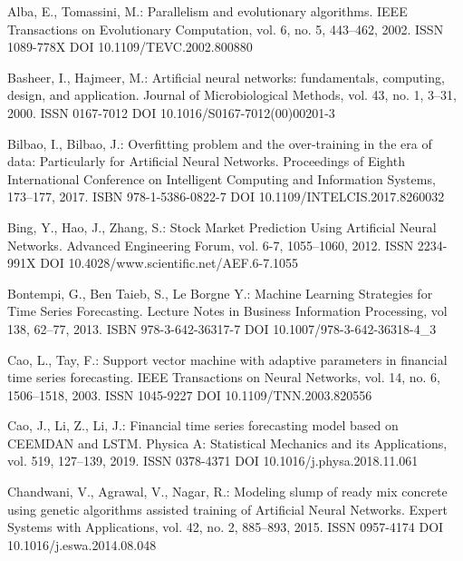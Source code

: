 
\begin{thebibliography}{99.}

 Alba, E., Tomassini, M.: Parallelism and evolutionary algorithms. IEEE Transactions on Evolutionary Computation, vol. 6, no. 5, 443--462, 2002. ISSN 1089-778X DOI 10.1109/TEVC.2002.800880

 Basheer, I., Hajmeer, M.: Artificial neural networks: fundamentals, computing, design, and application. Journal of Microbiological Methods, vol. 43, no. 1, 3--31, 2000. ISSN 0167-7012 DOI 10.1016/S0167-7012(00)00201-3

 Bilbao, I., Bilbao, J.: Overfitting problem and the over-training in the era of data: Particularly for Artificial Neural Networks. Proceedings of Eighth International Conference on Intelligent Computing and Information Systems, 173--177, 2017. ISBN 978-1-5386-0822-7 DOI 10.1109/INTELCIS.2017.8260032

 Bing, Y., Hao, J., Zhang, S.: Stock Market Prediction Using Artificial Neural Networks. Advanced Engineering Forum, vol. 6-7, 1055--1060, 2012. ISSN 2234-991X DOI 10.4028/www.scientific.net/AEF.6-7.1055

 Bontempi, G., Ben Taieb, S., Le Borgne Y.: Machine Learning Strategies for Time Series Forecasting. Lecture Notes in Business Information Processing, vol 138, 62--77, 2013. ISBN 978-3-642-36317-7 DOI 10.1007/978-3-642-36318-4\_3

 Cao, L., Tay, F.: Support vector machine with adaptive parameters in financial time series forecasting. IEEE Transactions on Neural Networks, vol. 14, no. 6, 1506--1518, 2003. ISSN 1045-9227 DOI 10.1109/TNN.2003.820556

 Cao, J., Li, Z., Li, J.: Financial time series forecasting model based on CEEMDAN and LSTM. Physica A: Statistical Mechanics and its Applications, vol. 519, 127--139, 2019. ISSN 0378-4371 DOI 10.1016/j.physa.2018.11.061

 Chandwani, V., Agrawal, V., Nagar, R.: Modeling slump of ready mix concrete using genetic algorithms assisted training of Artificial Neural Networks. Expert Systems with Applications, vol. 42, no. 2, 885--893, 2015. ISSN 0957-4174 DOI 10.1016/j.eswa.2014.08.048


\end{thebibliography}
